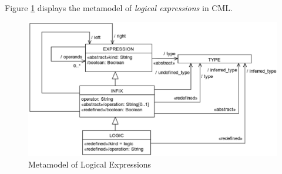 Figure \ref{fig:meta:logical-expr} displays the metamodel of
\emph{logical expressions} in CML.

\begin{figure}[H]
\centering
\includegraphics[width=1.2\textwidth]{metamodel/logical-expr}
\caption{Metamodel of Logical Expressions}
\label{fig:meta:logical-expr}
\end{figure}
